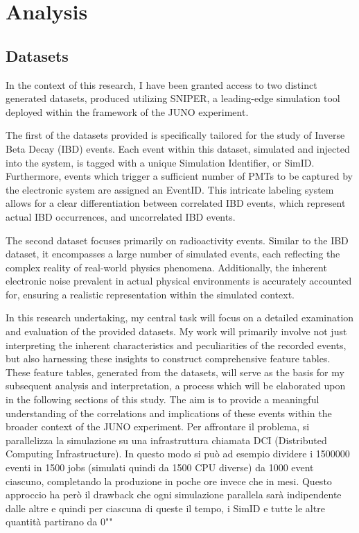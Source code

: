 \chapter{Analysis}

\section{Datasets}
In the context of this research, I have been granted access to two distinct generated datasets, produced utilizing SNIPER, a leading-edge simulation tool deployed within the framework of the JUNO experiment. 

The first of the datasets provided is specifically tailored for the study of Inverse Beta Decay (IBD) events. Each event within this dataset, simulated and injected into the system, is tagged with a unique Simulation Identifier, or SimID. Furthermore, events which trigger a sufficient number of PMTs to be captured by the electronic system are assigned an EventID. This intricate labeling system allows for a clear differentiation between correlated IBD events, which represent actual IBD occurrences, and uncorrelated IBD events.



The second dataset focuses primarily on radioactivity events. Similar to the IBD dataset, it encompasses a large number of simulated events, each reflecting the complex reality of real-world physics phenomena. Additionally, the inherent electronic noise prevalent in actual physical environments is accurately accounted for, ensuring a realistic representation within the simulated context.

In this research undertaking, my central task will focus on a detailed examination and evaluation of the provided datasets. My work will primarily involve not just interpreting the inherent characteristics and peculiarities of the recorded events, but also harnessing these insights to construct comprehensive feature tables. These feature tables, generated from the datasets, will serve as the basis for my subsequent analysis and interpretation, a process which will be elaborated upon in the following sections of this study. The aim is to provide a meaningful understanding of the correlations and implications of these events within the broader context of the JUNO experiment.
Per affrontare il problema, si parallelizza la simulazione su una infrastruttura chiamata DCI (Distributed Computing Infrastructure).
In questo modo si può ad esempio dividere i 1500000 eventi in 1500 jobs (simulati quindi da 1500 CPU diverse) da 1000 event ciascuno, completando la produzione in poche ore invece che in mesi.
Questo approccio ha però il drawback che ogni simulazione parallela sarà indipendente dalle altre e quindi per ciascuna di queste il tempo, i SimID e tutte le altre quantità partirano da 0"" 

